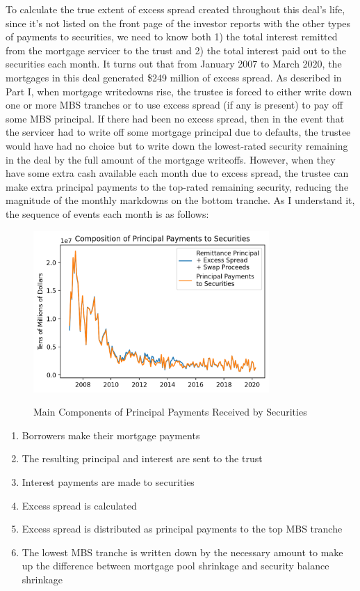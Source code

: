 \documentclass[12pt]{article}
\begin{document}
To calculate the true extent of excess spread created throughout this deal’s life, since it’s not listed on the front page of the investor reports with the other types of payments to securities, we need to know both 1) the total interest remitted from the mortgage servicer to the trust and 2) the total interest paid out to the securities each month. It turns out that from January 2007 to March 2020, the mortgages in this deal generated \$249 million of excess spread. As described in Part I, when mortgage writedowns rise, the trustee is forced to either write down one or more MBS tranches or to use excess spread (if any is present) to pay off some MBS principal. If there had been no excess spread, then in the event that the servicer had to write off some mortgage principal due to defaults, the trustee would have had no choice but to write down the lowest-rated security remaining in the deal by the full amount of the mortgage writeoffs. However, when they have some extra cash available each month due to excess spread, the trustee can make extra principal payments to the top-rated remaining security, reducing the magnitude of the monthly markdowns on the bottom tranche. As I understand it, the sequence of events each month is as follows: 

\begin{figure}[h]
	\centering
	\caption{Main Components of Principal Payments Received by Securities}
	\includegraphics[width=0.8\textwidth]{../figures/timeseries_security_principal_pmts_composition}
	\label{fig:timeseries_security_principal_pmts_composition}
\end{figure}

\begin{enumerate}
	\item Borrowers make their mortgage payments
	\item The resulting principal and interest are sent to the trust
	\item Interest payments are made to securities
	\item Excess spread is calculated
	\item Excess spread is distributed as principal payments to the top MBS tranche
	\item The lowest MBS tranche is written down by the necessary amount to make up the difference between mortgage pool shrinkage and security balance shrinkage
\end{enumerate}
\end{document}
